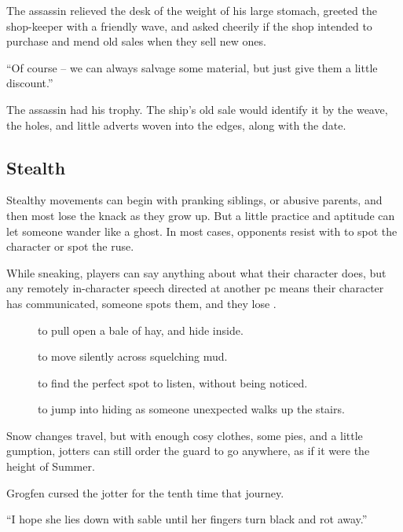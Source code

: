 \begin{multicols}{2}
\begin{exampletext}
  The assassin relieved the desk of the weight of his large stomach, greeted the shop-keeper with a friendly wave, and asked cheerily if the shop intended to purchase and mend old sales when they sell new ones.

  ``Of course -- we can always salvage some material, but just give them a little discount.''

  The assassin had his trophy.
  The ship's old sale would identify it by the weave, the holes, and little adverts woven into the edges, along with the date.

\end{exampletext}

\subsection{Stealth}

Stealthy movements can begin with pranking siblings, or abusive parents, and then most lose the knack as they grow up.
But a little practice and aptitude can let someone wander like a ghost.
In most cases, opponents resist with  to spot the character or spot the ruse.

While sneaking, players can say anything about what their character does, but any remotely in-character speech directed at another \gls{pc} means their character has communicated, someone spots them, and they lose .

\begin{description}
  \item[]
    to pull open a bale of hay, and hide inside.
  \item[]
    to move silently across squelching mud.
  \item[]
    to find the perfect spot to listen, without being noticed.
  \item[]
    to jump into hiding as someone unexpected walks up the stairs.
\end{description}

\begin{exampletext}
  Snow changes travel, but with enough cosy clothes, some pies, and a little gumption, \glspl{jotter} can still order the \gls{guard} to go anywhere, as if it were the height of Summer.

  Grogfen cursed the \gls{jotter} for the tenth time that journey.

  ``I hope she lies down with \gls{sable} until her fingers turn black and rot away.''


\end{exampletext}
\end{multicols}
